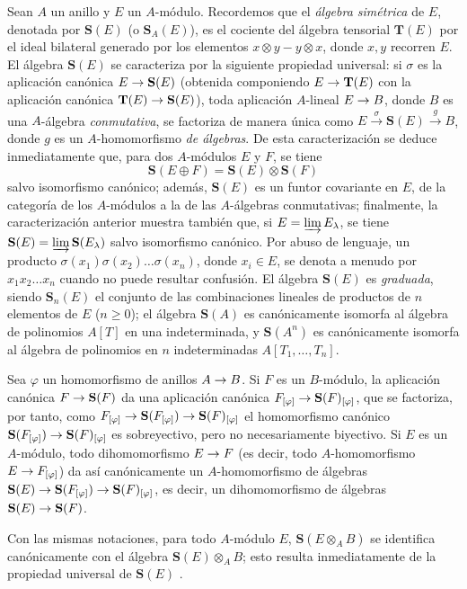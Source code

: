 \documentclass[oneside,10pt]{amsart}
\makeatletter
\renewcommand{\geq}{\geqslant}
\newcommand{\ega@arrow}[2]{\mathchoice{#1}{#2}{#2}{#2}}
\renewcommand{\to}{\ega@arrow{\longrightarrow}{\rightarrow}}
\newcommand{\oldpage}[2][]{\marginnote{\normalfont\footnotesize\textbf{#1}~|~#2}\ignorespaces}
\let\EGAOriginalLabel\label
\renewcommand{\label}[1]{\phantomsection\EGAOriginalLabel{#1}}
\makeatother
\begin{document}
\begin{env}[1.7.1]
\label{II.1.7.1-fr}
Sean $A$ un anillo y $E$ un $A$-módulo.
Recordemos que el \emph{álgebra simétrica} de $E$, denotada por $\mathbf{S}(E)$ (o $\mathbf{S}_A(E)$), es el cociente del álgebra tensorial $\mathbf{T}(E)$ por el ideal bilateral generado por los elementos $x\otimes y-y\otimes x$, donde $x,y$ recorren $E$.
El álgebra $\mathbf{S}(E)$ se caracteriza por la siguiente propiedad universal: si $\sigma$ es la aplicación canónica $E\to\mathbf{S}(E)$ (obtenida componiendo $E\to\mathbf{T}(E)$ con la aplicación canónica $\mathbf{T}(E)\to\mathbf{S}(E)$), toda aplicación $A$-lineal $E\to B$, donde $B$ es una $A$-álgebra \emph{conmutativa}, se factoriza de manera única como
$E\xrightarrow{\sigma}\mathbf{S}(E)\xrightarrow{g}B$,
donde $g$ es un $A$-homomorfismo \emph{de álgebras}.
De esta caracterización se deduce inmediatamente que, para dos $A$-módulos $E$ y $F$, se tiene
\[
  \mathbf{S}(E\oplus F)=\mathbf{S}(E)\otimes\mathbf{S}(F)
\]
\oldpage[II]{15}
salvo isomorfismo canónico; además, $\mathbf{S}(E)$ es un funtor covariante en $E$, de la categoría de los $A$-módulos a la de las $A$-álgebras conmutativas; finalmente, la caracterización anterior muestra también que, si $E=\varinjlim E_\lambda$, se tiene $\mathbf{S}(E)=\varinjlim\mathbf{S}(E_\lambda)$ salvo isomorfismo canónico.
Por abuso de lenguaje, un producto $\sigma(x_1)\sigma(x_2)\ldots\sigma(x_n)$, donde $x_i\in E$, se denota a menudo por $x_1x_2\ldots x_n$ cuando no puede resultar confusión.
El álgebra $\mathbf{S}(E)$ es \emph{graduada}, siendo $\mathbf{S}_n(E)$ el conjunto de las combinaciones lineales de productos de $n$ elementos de $E$ ($n\geq 0$); el álgebra $\mathbf{S}(A)$ es canónicamente isomorfa al álgebra de polinomios $A[T]$ en una indeterminada, y $\mathbf{S}(A^n)$ es canónicamente isomorfa al álgebra de polinomios en $n$ indeterminadas $A[T_1,\ldots,T_n]$.
\end{env}

\begin{env}[1.7.2]
\label{II.1.7.2-fr}
Sea $\varphi$ un homomorfismo de anillos $A\to B$.
Si $F$ es un $B$-módulo, la aplicación canónica $F\to\mathbf{S}(F)$ da una aplicación canónica $F_{[\varphi]}\to\mathbf{S}(F)_{[\varphi]}$, que se factoriza, por tanto, como
$F_{[\varphi]}\to\mathbf{S}(F_{[\varphi]})\to
\mathbf{S}(F)_{[\varphi]}$
el homomorfismo canónico $\mathbf{S}(F_{[\varphi]})\to\mathbf{S}(F)_{[\varphi]}$ es sobreyectivo, pero no necesariamente biyectivo.
Si $E$ es un $A$-módulo, todo dihomomorfismo $E\to F$ (es decir, todo $A$-homomorfismo $E\to F_{[\varphi]}$) da así canónicamente un $A$-homomorfismo de álgebras
$\mathbf{S}(E)\to\mathbf{S}(F_{[\varphi]})\to
\mathbf{S}(F)_{[\varphi]}$,
es decir, un dihomomorfismo de álgebras $\mathbf{S}(E)\to\mathbf{S}(F)$.

Con las mismas notaciones, para todo $A$-módulo $E$, $\mathbf{S}(E\otimes_A B)$ se identifica canónicamente con el álgebra $\mathbf{S}(E)\otimes_A B$; esto resulta inmediatamente de la propiedad universal de $\mathbf{S}(E)$ .
\end{env}
\end{document}
